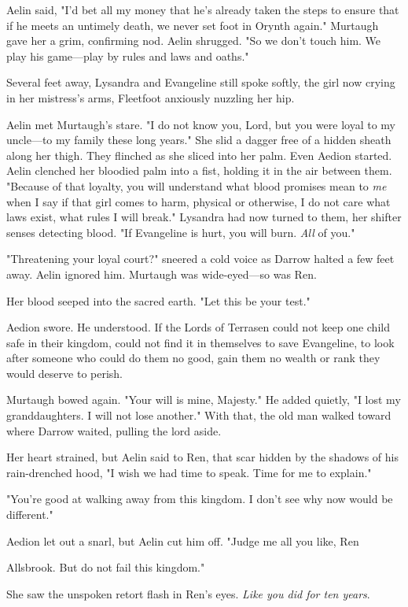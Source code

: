 Aelin said, "I'd bet all my money that he's already taken the steps to ensure that if he meets an untimely death, we never set foot in Orynth again." Murtaugh gave her a grim, confirming nod. Aelin shrugged. "So we don't touch him. We play his game---play by rules and laws and oaths."

Several feet away, Lysandra and Evangeline still spoke softly, the girl now crying in her mistress's arms, Fleetfoot anxiously nuzzling her hip.

Aelin met Murtaugh's stare. "I do not know you, Lord, but you were loyal to my uncle---to my family these long years." She slid a dagger free of a hidden sheath along her thigh. They flinched as she sliced into her palm. Even Aedion started. Aelin clenched her bloodied palm into a fist, holding it in the air between them. "Because of that loyalty, you will understand what blood promises mean to \emph{me} when I say if that girl comes to harm, physical or otherwise, I do not care what laws exist, what rules I will break." Lysandra had now turned to them, her shifter senses detecting blood. "If Evangeline is hurt, you will burn. \emph{All} of you."

"Threatening your loyal court?" sneered a cold voice as Darrow halted a few feet away. Aelin ignored him. Murtaugh was wide-eyed---so was Ren.

Her blood seeped into the sacred earth. "Let this be your test."

Aedion swore. He understood. If the Lords of Terrasen could not keep one child safe in their kingdom, could not find it in themselves to save Evangeline, to look after someone who could do them no good, gain them no wealth or rank  they would deserve to perish.

Murtaugh bowed again. "Your will is mine, Majesty." He added quietly, "I lost my granddaughters. I will not lose another." With that, the old man walked toward where Darrow waited, pulling the lord aside.

Her heart strained, but Aelin said to Ren, that scar hidden by the shadows of his rain-drenched hood, "I wish we had time to speak. Time for me to explain."

"You're good at walking away from this kingdom. I don't see why now would be different."

Aedion let out a snarl, but Aelin cut him off. "Judge me all you like, Ren

Allsbrook. But do not fail this kingdom."

She saw the unspoken retort flash in Ren's eyes. \emph{Like you did for ten years}.

